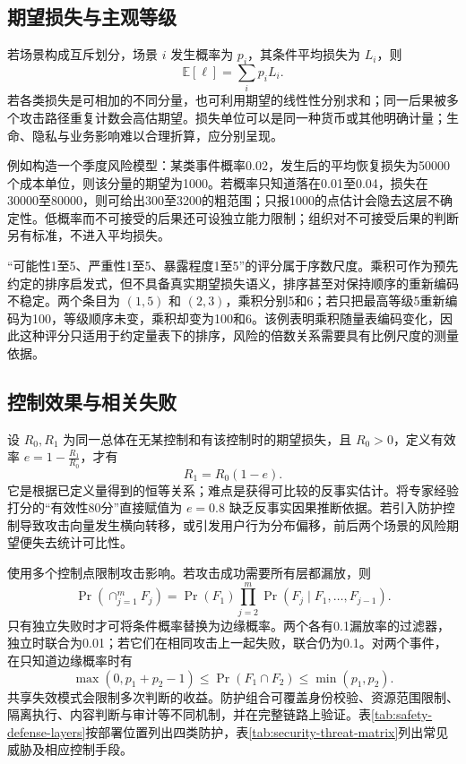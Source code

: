 \documentclass[../textbook.tex]{subfiles}
\begin{document}
\subsection{期望损失与主观等级}


若场景构成互斥划分，场景 $i$ 发生概率为 $p_i$，其条件平均损失为 $L_i$，则
\begin{equation}
 \mathbb E[\ell]=\sum_i p_iL_i.
 \label{eq:security-risk}
\end{equation}
若各类损失是可相加的不同分量，也可利用期望的线性性分别求和；同一后果被多个攻击路径重复计数会高估期望。损失单位可以是同一种货币或其他明确计量；生命、隐私与业务影响难以合理折算，应分别呈现。

\begin{example}[风险估计与不确定性]
例如构造一个季度风险模型：某类事件概率0.02，发生后的平均恢复损失为50000个成本单位，则该分量的期望为1000。若概率只知道落在0.01至0.04，损失在30000至80000，则可给出300至3200的粗范围；只报1000的点估计会隐去这层不确定性。低概率而不可接受的后果还可设独立能力限制；组织对不可接受后果的判断另有标准，不进入平均损失。
\end{example}

“可能性1至5、严重性1至5、暴露程度1至5”的评分属于序数尺度。乘积可作为预先约定的排序启发式，但不具备真实期望损失语义，排序甚至对保持顺序的重新编码不稳定。两个条目为 $(1,5)$ 和 $(2,3)$，乘积分别5和6；若只把最高等级5重新编码为100，等级顺序未变，乘积却变为100和6。该例表明乘积随量表编码变化，因此这种评分只适用于约定量表下的排序，风险的倍数关系需要具有比例尺度的测量依据。

\subsection{控制效果与相关失败}
设 $R_0,R_1$ 为同一总体在无某控制和有该控制时的期望损失，且 $R_0>0$，定义有效率 $e=1-\frac{R_1}{R_0}$，才有
\begin{equation}
 R_1=R_0(1-e).
\end{equation}
它是根据已定义量得到的恒等关系；难点是获得可比较的反事实估计。将专家经验打分的“有效性80分”直接赋值为 $e=0.8$ 缺乏反事实因果推断依据。若引入防护控制导致攻击向量发生横向转移，或引发用户行为分布偏移，前后两个场景的风险期望便失去统计可比性。

使用多个控制点限制攻击影响。若攻击成功需要所有层都漏放，则
\begin{equation}
 \Pr(\cap_{j=1}^mF_j)=\Pr(F_1)\prod_{j=2}^m
 \Pr(F_j\mid F_1,\ldots,F_{j-1}).
 \label{eq:security-defense}
\end{equation}
只有独立失败时才可将条件概率替换为边缘概率。两个各有0.1漏放率的过滤器，独立时联合为0.01；若它们在相同攻击上一起失败，联合仍为0.1。对两个事件，在只知道边缘概率时有
\begin{equation}
 \max(0,p_1+p_2-1)\le\Pr(F_1\cap F_2)\le\min(p_1,p_2).
\end{equation}
共享失效模式会限制多次判断的收益。防护组合可覆盖身份校验、资源范围限制、隔离执行、内容判断与审计等不同机制，并在完整链路上验证。表\ref{tab:safety-defense-layers}按部署位置列出四类防护，表\ref{tab:security-threat-matrix}列出常见威胁及相应控制手段。
\end{document}
